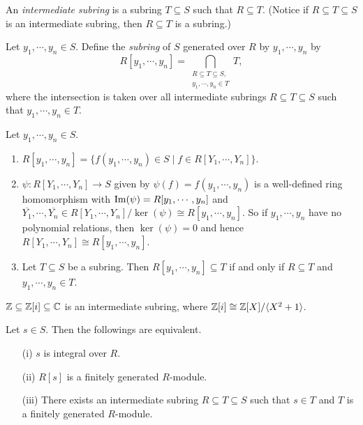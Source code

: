 \begin{definition}
    An \emph{intermediate subring} is a subring $T \subseteq S$ such that $R \subseteq T$. (Notice if $R \subseteq T \subseteq S$ is an intermediate subring, then $R \subseteq T$ is a subring.) \par
    Let $y_1,\cdots,y_n \in S$. Define the \emph{subring} of $S$ generated over $R$ by $y_1,\cdots,y_n$ by
    \[R[y_1,\cdots,y_n] = \bigcap_{\substack{R \subseteq T \subseteq S, \\ y_1,\cdots,y_n \in T}}T,\]
    where the intersection is taken over all intermediate subrings $R \subseteq T \subseteq S$ such that $y_1,\cdots,y_n \in T$. \par
\end{definition}

\begin{fact}
    Let $y_1,\cdots,y_n \in S$.
    \begin{enumerate}
        \item $R[y_1,\cdots,y_n] = \{f(y_1,\cdots,y_n) \in S \mid f \in R[Y_1,\cdots,Y_n]\}$.
        \item $\psi: R[Y_1,\cdots,Y_n] \to S$ given by $\psi(f) = f(y_1,\cdots,y_n)$ is a well-defined ring homomorphism with $\operatorname{Im}(\psi) = R[y_1,\cdots,y_n]$ and $\overbar{Y_1},\cdots,\overbar {Y_n} \in R[Y_1,\cdots,Y_n]/\ker(\psi) \cong R[y_1,\cdots,y_n]$. So if $y_1,\cdots,y_n$ have no polynomial relations, then $\ker(\psi) = 0$ and hence $R[Y_1,\cdots,Y_n] \cong R[y_1,\cdots,y_n]$.
        \item Let $T \subseteq S$ be a subring. Then $R[y_1,\cdots,y_n] \subseteq T$ if and only if $R \subseteq T$ and $y_1,\cdots,y_n \in T$.
    \end{enumerate}
\end{fact}

\begin{example}
    $\mathbb{Z} \subseteq \mathbb{Z}[i] \subseteq \mathbb{C}$ is an intermediate subring, where $\mathbb{Z}[i] \cong \mathbb{Z}[X]/\langle X^{2}+1 \rangle$.
\end{example}

\begin{proposition}
    Let $s \in S$. Then the followings are equivalent. 
    \begin{enumerate}
        \item[(i)] $s$ is integral over $R$.
        \item[(ii)] $R[s]$ is a finitely generated $R$-module.
        \item[(iii)] There exists an intermediate subring $R \subseteq T \subseteq S$ such that $s \in T$ and $T$ is a finitely generated $R$-module.
    \end{enumerate}
\end{proposition}

